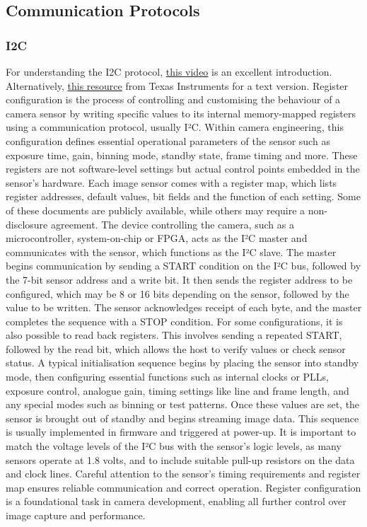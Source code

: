 \subsection{Communication Protocols}
\subsubsection{I2C}
For understanding the I2C protocol, \href{https://www.youtube.com/watch?v=CAvawEcxoPU&t=419s}{this video} is an excellent introduction.
Alternatively, \href{https://www.ti.com/lit/an/slva704/slva704.pdf?ts=1752540634031&ref_url=https%253A%252F%252Fwww.google.com%252F}{this resource} from Texas Instruments for a text version.
\nl
Register configuration is the process of controlling and customising the behaviour of a camera sensor by writing specific values to its internal memory-mapped registers using a communication protocol, usually I²C.
Within camera engineering, this configuration defines essential operational parameters of the sensor such as exposure time, gain, binning mode, standby state, frame timing and more.
These registers are not software-level settings but actual control points embedded in the sensor's hardware. Each image sensor comes with a register map, which lists register addresses, default values, bit fields and the function of each setting. Some of these documents are publicly available, while others may require a non-disclosure agreement.
\nl
The device controlling the camera, such as a microcontroller, system-on-chip or FPGA, acts as the I²C master and communicates with the sensor, which functions as the I²C slave. 
The master begins communication by sending a START condition on the I²C bus, followed by the 7-bit sensor address and a write bit. It then sends the register address to be configured, which may be 8 or 16 bits depending on the sensor, followed by the value to be written.
The sensor acknowledges receipt of each byte, and the master completes the sequence with a STOP condition. For some configurations, it is also possible to read back registers. This involves sending a repeated START, followed by the read bit, which allows the host to verify values or check sensor status.
\nl
A typical initialisation sequence begins by placing the sensor into standby mode, then configuring essential functions such as internal clocks or PLLs, exposure control, analogue gain, timing settings like line and frame length, and any special modes such as binning or test patterns.
Once these values are set, the sensor is brought out of standby and begins streaming image data. This sequence is usually implemented in firmware and triggered at power-up. It is important to match the voltage levels of the I²C bus with the sensor's logic levels, as many sensors operate at 1.8 volts, and to include suitable pull-up resistors on the data and clock lines.
Careful attention to the sensor's timing requirements and register map ensures reliable communication and correct operation. Register configuration is a foundational task in camera development, enabling all further control over image capture and performance.

